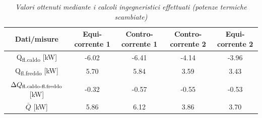\documentclass[a4paper,10pt]{article}                                                                                       %
\begin{document}
\begin{table}[H]                                                                                                            %
  \caption{\textit{Valori ottenuti mediante i calcoli ingegneristici effettuati (potenze termiche scambiate)}}              %
  \label{tab:heat_tr_calcs}                                                                                                 %
  \vspace{3mm}                                                                                                              %
  \centering                                                                                                                %
  \begin{tabular}{||c|c|c|c|c||}                                                                                            %
    \hline
    Dati/misure                                         & Equi-corrente 1 & Contro-corrente 1 & Contro-corrente 2 & Equi-corrente 2 \\
    \hline\hline
    Q\textsubscript{fl.caldo} [kW]                      & -6.02           & -6.41             & -4.14             & -3.96           \\
    Q\textsubscript{fl.freddo} [kW]                     & 5.70            & 5.84              & 3.59              & 3.43            \\
    $\Delta{Q\textsubscript{fl.caldo-fl.freddo}}$ [kW]  & -0.32           & -0.57             & -0.55             & -0.53           \\
    $\bar{Q}$ [kW]                                      & 5.86            & 6.12              & 3.86              & 3.70            \\
    \hline
  \end{tabular}                                                                                                             %
\end{table}                                                                                                                 %
\end{document}
